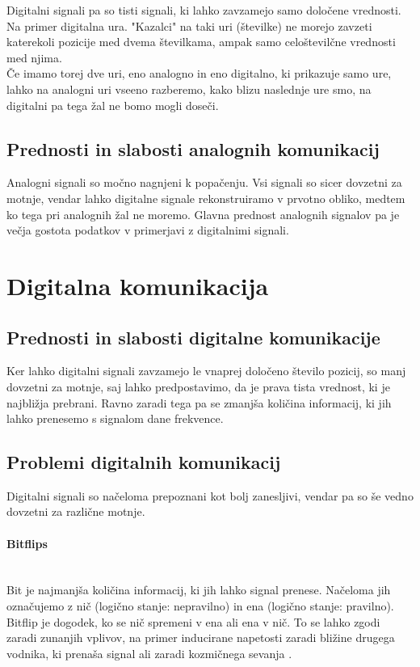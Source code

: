 \documentclass[12pt]{article}
\begin{document}
        Digitalni signali pa so tisti signali, ki lahko zavzamejo samo
        določene vrednosti. Na primer digitalna ura. "Kazalci" na taki uri
        (številke) ne morejo zavzeti katerekoli pozicije med dvema
        številkama, ampak samo celoštevilčne vrednosti med njima.\\

        Če imamo torej dve uri, eno analogno in eno digitalno, ki prikazuje
        samo ure, lahko na analogni uri vseeno razberemo, kako blizu
        naslednje ure smo, na digitalni pa tega žal ne bomo mogli doseči.
    \newpage
    \subsection{Prednosti in slabosti analognih komunikacij}
        Analogni signali so močno nagnjeni k popačenju. Vsi signali so sicer
        dovzetni za motnje, vendar lahko digitalne signale rekonstruiramo v
        prvotno obliko, medtem ko tega pri analognih žal ne moremo. Glavna
        prednost analognih signalov pa je večja gostota podatkov v primerjavi z
        digitalnimi signali.

\section{Digitalna komunikacija}
    \subsection{Prednosti in slabosti digitalne komunikacije}
        Ker lahko digitalni signali zavzamejo le vnaprej določeno število
        pozicij, so manj dovzetni za motnje, saj lahko predpostavimo, da je
        prava tista vrednost, ki je najbližja prebrani. Ravno zaradi tega pa se
        zmanjša količina informacij, ki jih lahko prenesemo s signalom dane
        frekvence.
    \subsection{Problemi digitalnih komunikacij}
        Digitalni signali so načeloma prepoznani kot bolj zanesljivi, vendar pa
        so še vedno dovzetni za različne motnje.
        \paragraph*{Bitflips} \mbox{} \\
            Bit je najmanjša količina informacij, ki jih lahko signal prenese.
            Načeloma jih označujemo z nič (logično stanje: nepravilno) in ena
            (logično stanje: pravilno). Bitflip je dogodek, ko se nič spremeni v
            ena ali ena v nič. To se lahko zgodi zaradi zunanjih vplivov, na
            primer inducirane napetosti zaradi bližine drugega vodnika, ki
            prenaša signal ali zaradi kozmičnega sevanja
            \cite{veritasium_computers}.
\end{document}
